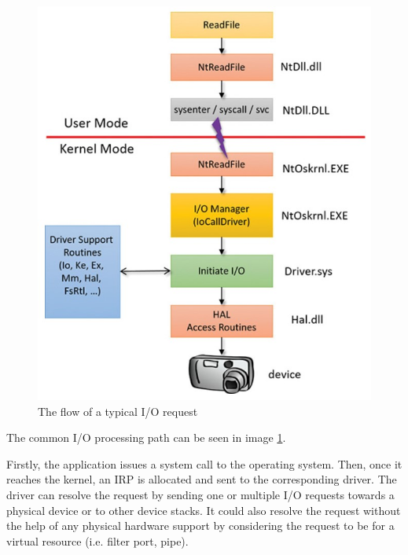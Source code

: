 	
		\begin{figure}[h!]
			\begin{center}
				\includegraphics[scale=0.9]{images/IORequest.jpg}
				\caption{The flow of a typical I/O request\cite{WindowsInternals}}
				\label{fig:IORequest}
			\end{center}
		\end{figure}
		\pagebreak

		The common I/O processing path can be seen in image \ref{fig:IORequest}.

		Firstly, the application issues a system call to the operating system. Then, once it reaches the kernel, an IRP is allocated and sent to the corresponding driver. The driver can resolve the request by sending one or multiple I/O requests towards a physical device or to other device stacks. It could also resolve the request without the help of any physical hardware support by considering the request to be for a virtual resource (i.e. filter port, pipe).
		
		
